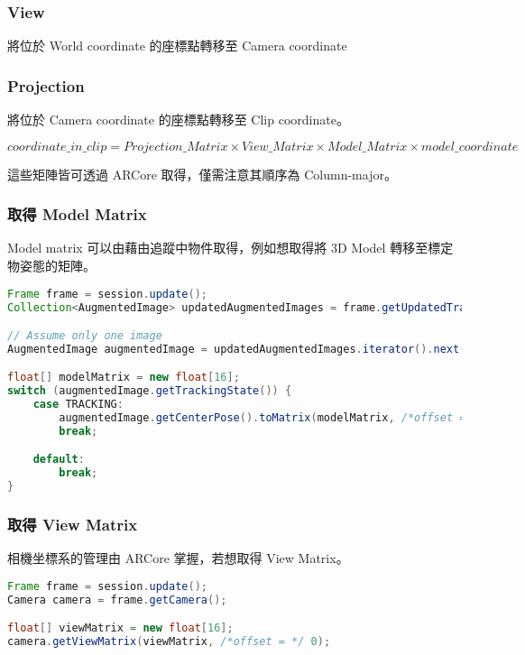 \subsubsection{View}
將位於 World coordinate 的座標點轉移至 Camera coordinate

\subsubsection{Projection}
將位於 Camera coordinate 的座標點轉移至 Clip coordinate。

\begin{center}
    $
        coordinate\_in\_clip = Projection\_Matrix \times View\_Matrix \times Model\_Matrix \times model\_coordinate
    $
\end{center}

這些矩陣皆可透過 ARCore 取得，僅需注意其順序為 Column-major。

\subsubsection{取得 Model Matrix}

Model matrix 可以由藉由追蹤中物件取得，例如想取得將 3D Model 轉移至標定物姿態的矩陣。

\begin{lstlisting}[language=Java, caption=將 3D model 的座標空間轉移至以標定物為準的空間]
Frame frame = session.update();
Collection<AugmentedImage> updatedAugmentedImages = frame.getUpdatedTrackables(AugmentedImage.class);

// Assume only one image
AugmentedImage augmentedImage = updatedAugmentedImages.iterator().next();

float[] modelMatrix = new float[16];
switch (augmentedImage.getTrackingState()) {
    case TRACKING:
        augmentedImage.getCenterPose().toMatrix(modelMatrix, /*offset = */ 0);
        break;

    default:
        break;
}
\end{lstlisting}

\subsubsection{取得 View Matrix}

相機坐標系的管理由 ARCore 掌握，若想取得 View Matrix。

\begin{lstlisting}[language=Java, caption=取得 View Matrix]
Frame frame = session.update();
Camera camera = frame.getCamera();

float[] viewMatrix = new float[16];
camera.getViewMatrix(viewMatrix, /*offset = */ 0);
\end{lstlisting}

